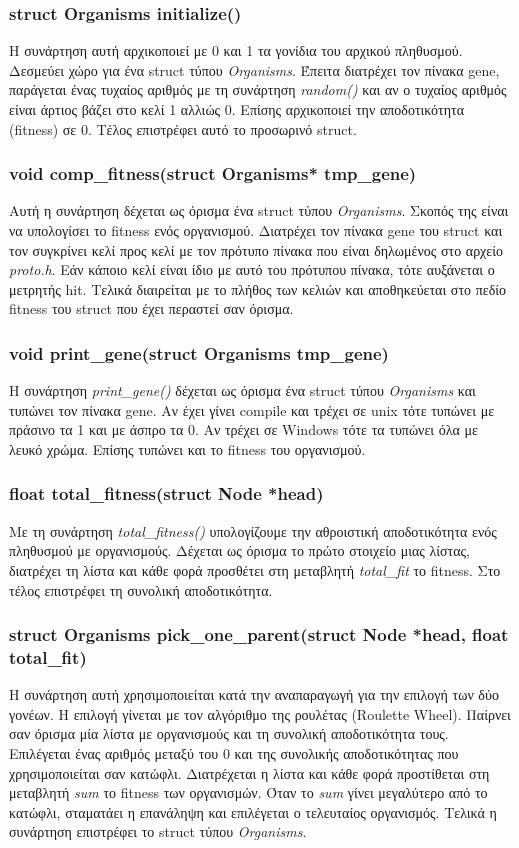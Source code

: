 \documentclass{article}
\begin{document}
\subsubsection{struct Organisms initialize()}
Η συνάρτηση αυτή αρχικοποιεί με 0 και 1 τα γονίδια του αρχικού πληθυσμού.
Δεσμεύει χώρο για ένα struct τύπου \emph{Organisms}. Έπειτα διατρέχει τον
πίνακα gene, παράγεται ένας τυχαίος αριθμός με τη συνάρτηση \emph{random()} και
αν ο τυχαίος αριθμός είναι άρτιος βάζει στο κελί 1 αλλιώς 0. Επίσης αρχικοποιεί
την αποδοτικότητα (fitness) σε 0. Τέλος επιστρέφει αυτό το προσωρινό struct.
\subsubsection{void comp\_fitness(struct Organisms* tmp\_gene)}
Αυτή η συνάρτηση δέχεται ως όρισμα ένα struct τύπου \emph{Organisms}. Σκοπός της
είναι να υπολογίσει το fitness ενός οργανισμού. Διατρέχει τον πίνακα gene του
struct και τον συγκρίνει κελί προς κελί με τον πρότυπο πίνακα που είναι
δηλωμένος στο αρχείο \emph{proto.h}. Εάν κάποιο κελί είναι ίδιο με αυτό του
πρότυπου πίνακα, τότε αυξάνεται ο μετρητής hit. Τελικά διαιρείται με το πλήθος
των κελιών και αποθηκεύεται στο πεδίο fitness του struct που έχει περαστεί σαν
όρισμα.
\subsubsection{void print\_gene(struct Organisms tmp\_gene)}
Η συνάρτηση \emph{print\_gene()} δέχεται ως όρισμα ένα struct τύπου
\emph{Organisms} και τυπώνει τον πίνακα gene. Αν έχει γίνει compile και τρέχει
σε unix τότε τυπώνει με πράσινο τα 1 και με άσπρο τα 0. Αν τρέχει σε Windows
τότε τα τυπώνει όλα με λευκό χρώμα. Επίσης τυπώνει και το fitness του
οργανισμού.
\subsubsection{float total\_fitness(struct Node *head)}
Με τη συνάρτηση \emph{total\_fitness()} υπολογίζουμε την αθροιστική
αποδοτικότητα ενός πληθυσμού με οργανισμούς. Δέχεται ως όρισμα το πρώτο στοιχείο
μιας λίστας, διατρέχει τη λίστα και κάθε φορά προσθέτει στη μεταβλητή
\emph{total\_fit} το fitness. Στο τέλος επιστρέφει τη συνολική αποδοτικότητα.
\subsubsection{struct Organisms pick\_one\_parent(struct Node *head, float total\_fit)}
Η συνάρτηση αυτή χρησιμοποιείται κατά την αναπαραγωγή για την επιλογή των δύο
γονέων. Η επιλογή γίνεται με τον αλγόριθμο της ρουλέτας (Roulette Wheel).
Παίρνει σαν όρισμα μία λίστα με οργανισμούς και τη συνολική αποδοτικότητα τους.
Επιλέγεται ένας αριθμός μεταξύ του 0 και της συνολικής αποδοτικότητας που
χρησιμοποιείται σαν κατώφλι. Διατρέχεται η λίστα και κάθε φορά προστίθεται στη
μεταβλητή \emph{sum} το fitness των οργανισμών. Όταν το \emph{sum} γίνει
μεγαλύτερο από το κατώφλι, σταματάει η επανάληψη και επιλέγεται ο τελευταίος
οργανισμός. Τελικά η συνάρτηση επιστρέφει το struct τύπου \emph{Organisms}.
\end{document}
